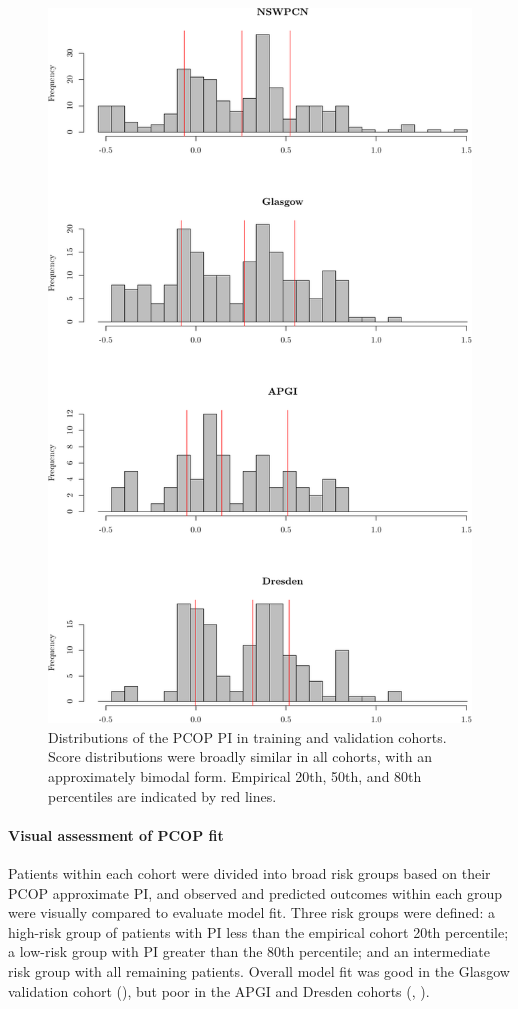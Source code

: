 \documentclass[dissertation.tex]{subfiles}
\begin{document}
\begin{figure}
\centering
  \includegraphics[width=.7\linewidth]{analysis/nomogram/figure/07-score-hists-1}
  \caption[\acrshort{PCOP} \acrshort{PI} distributions in training and validation cohorts]{Distributions of the \acrshort{PCOP} \acrshort{PI} in training and validation cohorts.  Score distributions were broadly similar in all cohorts, with an approximately bimodal form.  Empirical 20th, 50th, and 80th percentiles are indicated by red lines.}
\label{fig:nomo-score-hists}
\end{figure}

\paragraph{Visual assessment of \acrshort{PCOP} fit}
Patients within each cohort were divided into broad risk groups based on their \gls{PCOP} approximate \gls{PI}, and observed and predicted outcomes within each group were visually compared to evaluate model fit.  Three risk groups were defined: a high-risk group of patients with \gls{PI} less than the empirical cohort 20th percentile; a low-risk group with \gls{PI} greater than the 80th percentile; and an intermediate risk group with all remaining patients.  Overall model fit was good in the Glasgow validation cohort (), but poor in the \gls{APGI} and Dresden cohorts (, ).  
\end{document}
